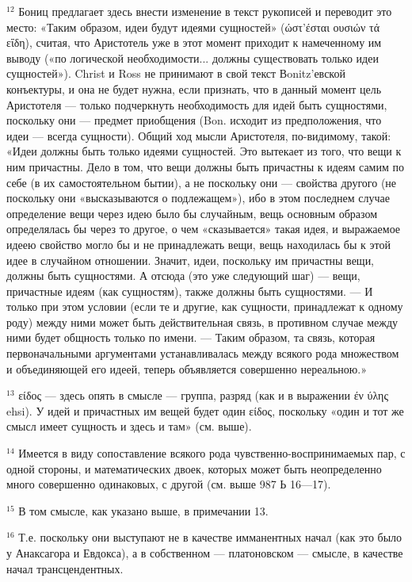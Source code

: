 \documentclass[oneside, 17pt, dvipsnames]{extbook}
\begin{document}
$^{12}$ Бониц предлагает здесь внести изменение в текст рукописей и переводит это место: «Таким образом, идеи будут идеями сущностей» (ώστ'έσται ουσιών τά εΐδη), считая, что Аристотель уже в этот момент приходит к намеченному им выводу («по логической необходимости... должны существовать только идеи сущностей»). Christ и Ross не принимают в свой текст Вonitz'евской конъектуры, и она не будет нужна, если признать, что в данный момент цель Аристотеля — только подчеркнуть необходимость для идей быть сущностями, поскольку они — предмет приобщения (Bon. исходит из предположения, что идеи — всегда сущности). Общий ход мысли Аристотеля, по-видимому, такой: «Идеи должны быть только идеями сущностей. Это вытекает из того, что вещи к ним причастны. Дело в том, что вещи должны быть причастны к идеям самим по себе (в их самостоятельном бытии), а не поскольку они — свойства другого (не поскольку они «высказываются о подлежащем»), ибо в этом последнем случае определение вещи через идею было бы случайным, вещь основным образом определялась бы через то другое, о чем «сказывается» такая идея, и выражаемое идеею свойство могло бы и не принадлежать вещи, вещь находилась бы к этой идее в случайном отношении. Значит, идеи, поскольку им причастны вещи, должны быть сущностями. А отсюда (это уже следующий шаг) — вещи, причастные идеям (как сущностям), также должны быть сущностями. — И только при этом условии (если те и другие, как сущности, принадлежат к одному роду) между ними может быть действительная связь, в противном случае между ними будет общность только по имени. — Таким образом, та связь, которая первоначальными аргументами устанавливалась между всякого рода множеством и объединяющей его идеей, теперь объявляется совершенно нереальною.»

$^{13}$ είδος — здесь опять в смысле — группа, разряд (как и в выражении έν ύλης ehsi). У идей и причастных им вещей будет один είδος, поскольку «один и тот же смысл имеет сущность и здесь и там» (см. выше).

$^{14}$ Имеется в виду сопоставление всякого рода чувственно-воспринимаемых пар, с одной стороны, и математических двоек, которых может быть неопределенно много совершенно одинаковых, с другой (см. выше 987 Ь 16—17).

$^{15}$ В том смысле, как указано выше, в примечании 13.

$^{16}$ Т.е. поскольку они выступают не в качестве имманентных начал (как это было у Анаксагора и Евдокса), а в собственном — платоновском — смысле, в качестве начал трансцендентных.
\end{document}
